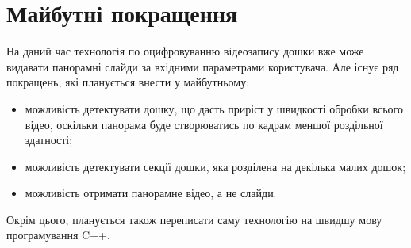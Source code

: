 \section{Майбутні покращення}

На даний час технологія по оцифровуванню відеозапису дошки вже може
видавати панорамні слайди за вхідними параметрами користувача. Але існує
ряд покращень, які планується внести у майбутньому:

\begin{itemize}
    \item можливість детектувати дошку, що дасть приріст у швидкості обробки
          всього відео, оскільки панорама буде створюватись по кадрам меншої роздільної
          здатності;
    \item можливість детектувати секції дошки, яка розділена на декілька малих дошок;
    \item можливість отримати панорамне відео, а не слайди.
\end{itemize}

Окрім цього, планується також переписати саму технологію на швидшу мову програмування
C++.
\clearpage